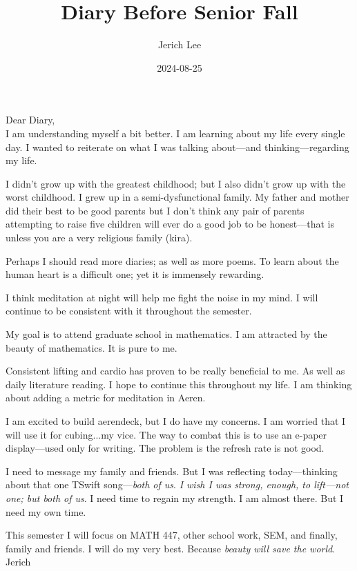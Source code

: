\documentclass[12pt]{article}
\title{Diary Before Senior Fall}
\author{Jerich Lee}
\date{2024-08-25}
\theoremstyle{definition} %
\theoremstyle{plain} %
\begin{document}
\maketitle
Dear Diary, \\
\vspace{.5cm} 
I am understanding myself a bit better. I am learning about my life every single day. I wanted to reiterate on what I was talking about—and thinking—regarding my life. 

I didn't grow up with the greatest childhood; but I also didn't grow up with the worst childhood. I grew up in a semi-dysfunctional family. My father and mother did their best to be good parents but I don't think any pair of parents attempting to raise five children will ever do a good job to be honest—that is unless you are a very religious family (kira). 

Perhaps I should read more diaries; as well as more poems. To learn about the human heart is a difficult one; yet it is immensely rewarding. 

I think meditation at night will help me fight the noise in my mind. I will continue to be consistent with it throughout the semester.

My goal is to attend graduate school in mathematics. I am attracted by the beauty of mathematics. It is pure to me. 

Consistent lifting and cardio has proven to be really beneficial to me. As well as daily literature reading. I hope to continue this throughout my life. I am thinking about adding a metric for meditation in Aeren. 

I am excited to build aerendeck, but I do have my concerns. I am worried that I will use it for cubing...my vice. The way to combat this is to use an e-paper display—used only for writing. The problem is the refresh rate is not good. 

I need to message my family and friends. But I was reflecting today—thinking about that one TSwift song—\emph{both of us}. \emph{I wish I was strong, enough, to lift—not one; but both of us}. I need time to regain my strength. I am almost there. But I need my own time. 

This semester I will focus on MATH 447, other school work, SEM, and finally, family and friends. I will do my very best. Because \emph{beauty will save the world}. 
\\
\vspace{.5cm} 
Jerich
\end{document}

